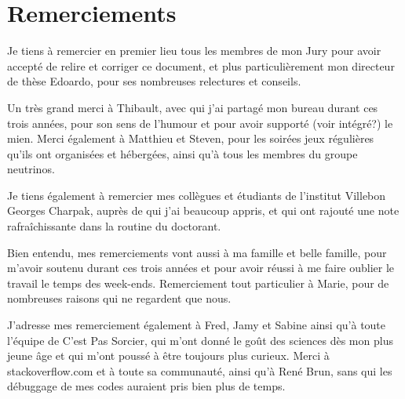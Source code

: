 \chapter*{Remerciements}

Je tiens à remercier en premier lieu tous les membres de mon Jury pour avoir accepté de relire et corriger ce document, et plus particulièrement mon directeur de thèse Edoardo, pour ses nombreuses relectures et conseils. 

Un très grand merci à Thibault, avec qui j'ai partagé mon bureau durant ces trois années, pour son sens de l'humour et pour avoir supporté (voir intégré?) le mien. Merci également à Matthieu et Steven, pour les soirées jeux régulières qu'ils ont organisées et hébergées, ainsi qu'à tous les membres du groupe neutrinos.

Je tiens également à remercier mes collègues et étudiants de l'institut Villebon Georges Charpak, auprès de qui j'ai beaucoup appris, et qui ont rajouté une note rafraîchissante dans la routine du doctorant.

Bien entendu, mes remerciements vont aussi à ma famille et belle famille, pour m'avoir soutenu durant ces trois années et pour avoir réussi à me faire oublier le travail le temps des week-ends. Remerciement tout particulier à Marie, pour de nombreuses raisons qui ne regardent que nous.

J'adresse mes remerciement également à Fred, Jamy et Sabine ainsi qu'à toute l'équipe de C'est Pas Sorcier, qui m'ont donné le goût des sciences dès mon plus jeune âge et qui m'ont poussé à être toujours plus curieux. Merci à stackoverflow.com et à toute sa communauté, ainsi qu'à René Brun, sans qui les débuggage de mes codes auraient pris bien plus de temps.